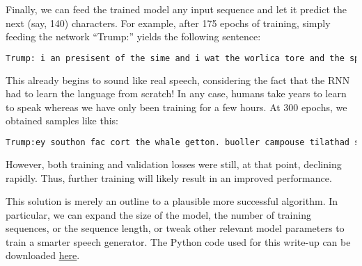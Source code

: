 \documentclass{article}
\begin{document}
\begin{remark}
Finally, we can feed the trained model any input sequence and let it predict the next (say, 140) characters. For example, after 175 epochs of training, simply feeding the network ``Trump:'' yields the following sentence:
\begin{lstlisting}[language=TeX,breaklines=True]
Trump: i an presisent of the sime and i wat the worlica tore and the spaising our componitien and i wat of the spared the worled the worle and the spaiting our communitien
\end{lstlisting}
This already begins to sound like real speech, considering the fact that the RNN had to learn the language from scratch! In any case, humans take years to learn to speak whereas we have only been training for a few hours. At 300 epochs, we obtained samples like this:
\begin{lstlisting}[language=TeX,breaklines=True]
Trump:ey southon fac cort the whale getton. buoller campouse tilathad sumplee ours dousting to beokew athing the semerica ince forette. [applause]
\end{lstlisting}
However, both training and validation losses were still, at that point, declining rapidly. Thus, further training will likely result in an improved performance.

This solution is merely an outline to a plausible more successful algorithm. In particular, we can expand the size of the model, the number of training sequences, or the sequence length, or tweak other relevant model parameters to train a smarter speech generator. The Python code used for this write-up can be downloaded \href{run:trump_generator.py}{here}.

\end{remark}
\end{document}
